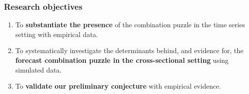\begin{frame}
    \frametitle{Research objectives}

    \begin{enumerate}[<+->]
        \item To \textbf{substantiate the presence} of the combination puzzle in the time series setting with empirical data. \newline
        \item To systematically investigate the determinants behind, and evidence for, the \textbf{forecast combination puzzle in the cross-sectional setting} using simulated data. \newline
        \item To \textbf{validate our preliminary conjecture} with empirical evidence.
    \end{enumerate}

\end{frame}

